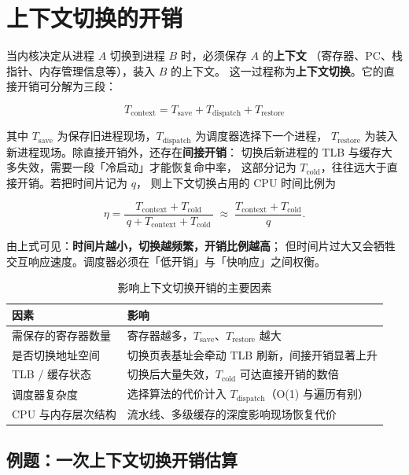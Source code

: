 \section{上下文切换的开销}
\label{sec:context}

当内核决定从进程 $A$ 切换到进程 $B$ 时，必须保存 $A$ 的\textbf{上下文}
（寄存器、PC、栈指针、内存管理信息等），装入 $B$ 的上下文。
这一过程称为\textbf{上下文切换}。它的直接开销可分解为三段：

\begin{equation}
    T_{\text{context}} = T_{\text{save}} + T_{\text{dispatch}} + T_{\text{restore}}
\end{equation}

\noindent 其中 $T_{\text{save}}$ 为保存旧进程现场，$T_{\text{dispatch}}$ 为调度器选择下一个进程，
$T_{\text{restore}}$ 为装入新进程现场。除直接开销外，还存在\textbf{间接开销}：
切换后新进程的 TLB 与缓存大多失效，需要一段「冷启动」才能恢复命中率，
这部分记为 $T_{\text{cold}}$，往往远大于直接开销。若把时间片记为 $q$，
则上下文切换占用的 CPU 时间比例为

\begin{equation}
    \eta = \frac{T_{\text{context}} + T_{\text{cold}}}{\,q + T_{\text{context}} + T_{\text{cold}}\,}
        \;\approx\; \frac{T_{\text{context}} + T_{\text{cold}}}{q}.
\end{equation}

\noindent 由上式可见：\textbf{时间片越小，切换越频繁，开销比例越高}；
但时间片过大又会牺牲交互响应速度。调度器必须在「低开销」与「快响应」之间权衡。

\begin{table}[H]
\centering
\caption{影响上下文切换开销的主要因素}
\begin{tabulary}{\textwidth}{LL}
\toprule
因素 & 影响 \\
\midrule
需保存的寄存器数量 & 寄存器越多，$T_{\text{save}}$、$T_{\text{restore}}$ 越大 \\
是否切换地址空间 & 切换页表基址会牵动 TLB 刷新，间接开销显著上升 \\
TLB / 缓存状态 & 切换后大量失效，$T_{\text{cold}}$ 可达直接开销的数倍 \\
调度器复杂度 & 选择算法的代价计入 $T_{\text{dispatch}}$（O(1) 与遍历有别） \\
CPU 与内存层次结构 & 流水线、多级缓存的深度影响现场恢复代价 \\
\bottomrule
\end{tabulary}
\end{table}

\subsection*{例题：一次上下文切换开销估算}

